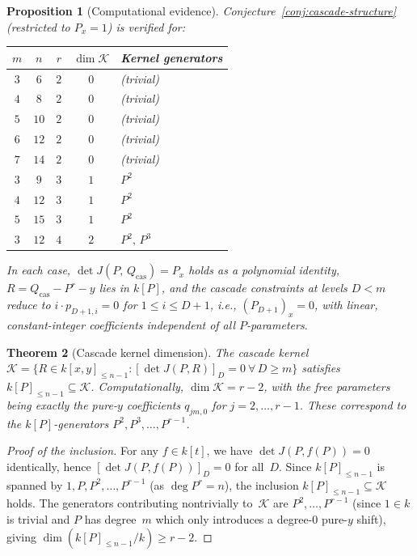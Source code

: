 \documentclass[12pt,a4paper]{article}
\newtheorem{theorem}{Theorem}[section]
\newtheorem{proposition}[theorem]{Proposition}
\theoremstyle{definition}
\newcommand{\kk}{k}
\begin{document}
\begin{proposition}[Computational evidence]\label{prop:cascade-identity-comp}
Conjecture~\ref{conj:cascade-structure} (restricted to $P_x = 1$)
is verified for:
\begin{center}
\begin{tabular}{ccccl}
\hline
$m$ & $n$ & $r$ & $\dim \mathcal{K}$ & Kernel generators \\
\hline
$3$ & $6$ & $2$ & $0$ & (trivial) \\
$4$ & $8$ & $2$ & $0$ & (trivial) \\
$5$ & $10$ & $2$ & $0$ & (trivial) \\
$6$ & $12$ & $2$ & $0$ & (trivial) \\
$7$ & $14$ & $2$ & $0$ & (trivial) \\
$3$ & $9$ & $3$ & $1$ & $P^2$ \\
$4$ & $12$ & $3$ & $1$ & $P^2$ \\
$5$ & $15$ & $3$ & $1$ & $P^2$ \\
$3$ & $12$ & $4$ & $2$ & $P^2,\, P^3$ \\
\hline
\end{tabular}
\end{center}
In each case, $\det J(P,\, Q_{\mathrm{cas}}) = P_x$ holds as a polynomial
identity, $R = Q_{\mathrm{cas}} - P^r - y$ lies in $\kk[P]$, and the
cascade constraints at levels $D < m$ reduce to
$i \cdot p_{D+1,i} = 0$ for $1 \leq i \leq D+1$, i.e., $(P_{D+1})_x = 0$,
with linear, constant-integer coefficients independent of all
$P$-parameters.
\end{proposition}

\begin{theorem}[Cascade kernel dimension]\label{thm:cascade-kernel-dim}
The cascade kernel $\mathcal{K} = \{R \in \kk[x,y]_{\leq n-1} :
[\det J(P,R)]_D = 0\ \forall\, D \geq m\}$ satisfies
$\kk[P]_{\leq n-1} \subseteq \mathcal{K}$.
Computationally, $\dim \mathcal{K} = r - 2$, with the free
parameters being exactly the pure-$y$ coefficients $q_{jm,0}$
for $j = 2, \ldots, r-1$. These correspond to the $\kk[P]$-generators
$P^2, P^3, \ldots, P^{r-1}$.
\end{theorem}

\begin{proof}[Proof of the inclusion]
For any $f \in \kk[t]$, we have $\det J(P, f(P)) = 0$ identically,
hence $[\det J(P, f(P))]_D = 0$ for all~$D$. Since
$\kk[P]_{\leq n-1}$ is spanned by $1, P, P^2, \ldots, P^{r-1}$
(as $\deg P^r = n$), the inclusion $\kk[P]_{\leq n-1} \subseteq \mathcal{K}$
holds. The generators contributing nontrivially to~$\mathcal{K}$ are
$P^2, \ldots, P^{r-1}$ (since $1 \in \kk$ is trivial and $P$ has
degree~$m$ which only introduces a degree-$0$ pure-$y$ shift),
giving $\dim(\kk[P]_{\leq n-1}/\kk) \geq r - 2$.
\end{proof}
\end{document}
